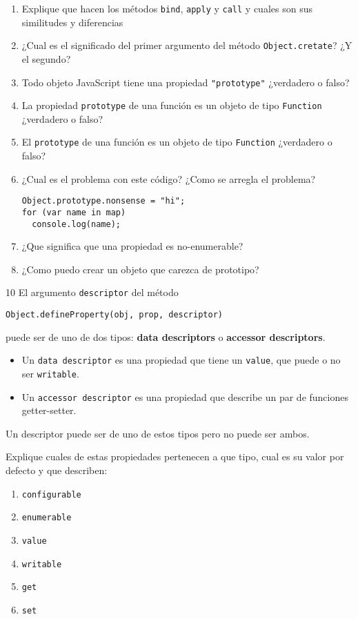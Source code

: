 \begin{enumerate}
\def\labelenumi{\arabic{enumi}.}
\setcounter{enumi}{1}
\item
  Explique que hacen los métodos \texttt{bind}, \texttt{apply} y
  \texttt{call} y cuales son sus similitudes y diferencias
\item
  ¿Cual es el significado del primer argumento del método
  \texttt{Object.cretate}? ¿Y el segundo?
\item
  Todo objeto JavaScript tiene una propiedad \texttt{"prototype"}
  ¿verdadero o falso?
\item
  La propiedad \texttt{prototype} de una función es un objeto de tipo
  \texttt{Function} ¿verdadero o falso?
\item
  El \texttt{prototype} de una función es un objeto de tipo
  \texttt{Function} ¿verdadero o falso?
\item
  ¿Cual es el problema con este código? ¿Como se arregla el problema?

\begin{verbatim}
Object.prototype.nonsense = "hi";
for (var name in map)
  console.log(name);
\end{verbatim}
\item
  ¿Que significa que una propiedad es no-enumerable? 
\item
  ¿Como puedo crear un objeto que carezca de prototipo? 
\end{enumerate}

10 El argumento \texttt{descriptor} del método

\begin{verbatim}
Object.defineProperty(obj, prop, descriptor)
\end{verbatim}

puede ser de uno de dos tipos: \textbf{data descriptors} o
\textbf{accessor descriptors}.

\begin{itemize}
\itemsep1pt\parskip0pt
\item
  Un \texttt{data descriptor} es una propiedad que tiene un
  \texttt{value}, que puede o no ser \texttt{writable}.
\item
  Un \texttt{accessor descriptor} es una propiedad que describe un par
  de funciones getter-setter.
\end{itemize}

Un descriptor puede ser de uno de estos tipos pero no puede ser ambos.

Explique cuales de estas propiedades pertenecen a que tipo, cual es su
valor por defecto y que describen:

\begin{enumerate}
\def\labelenumi{\arabic{enumi}.}
\itemsep1pt\parskip0pt
\item
  \texttt{configurable} 
\item
  \texttt{enumerable} 
\item
  \texttt{value} 
\item
  \texttt{writable} 
\item
  \texttt{get} 
\item
  \texttt{set} 
\end{enumerate}
